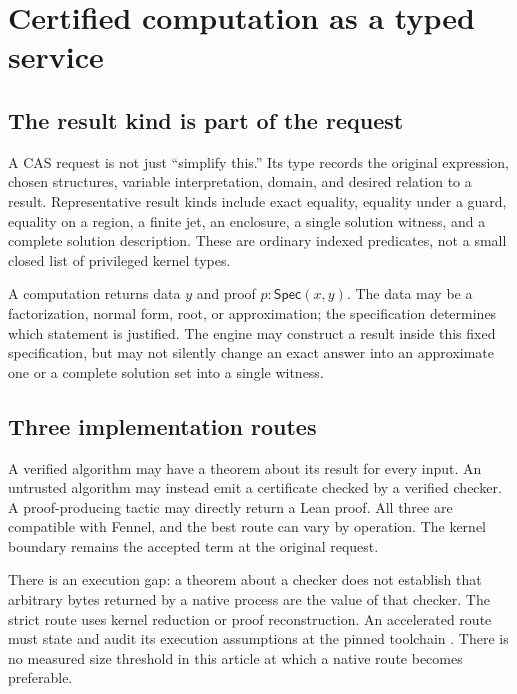 \documentclass[11pt,a4paper]{article}
\theoremstyle{definition}
\theoremstyle{remark}
\newcommand{\Spec}{\mathsf{Spec}}
\begin{document}
\section{Certified computation as a typed service}
\label{sec:cas}

\subsection{The result kind is part of the request}
A CAS request is not just ``simplify this.'' Its type records the original
expression, chosen structures, variable interpretation, domain, and desired
relation to a result. Representative result kinds include exact equality,
equality under a guard, equality on a region, a finite jet, an enclosure, a
single solution witness, and a complete solution description. These are
ordinary indexed predicates, not a small closed list of privileged kernel types.

A computation returns data $y$ and proof $p:\Spec(x,y)$. The data may be a
factorization, normal form, root, or approximation; the specification determines
which statement is justified. The engine may construct a result inside this
fixed specification, but may not silently change an exact answer into an
approximate one or a complete solution set into a single witness.

\subsection{Three implementation routes}
A verified algorithm may have a theorem about its result for every input. An
untrusted algorithm may instead emit a certificate checked by a verified
checker. A proof-producing tactic may directly return a Lean proof. All three
are compatible with Fennel, and the best route can vary by operation. The
kernel boundary remains the accepted term at the original request.

There is an execution gap: a theorem about a checker does not establish that
arbitrary bytes returned by a native process are the value of that checker.
The strict route uses kernel reduction or proof reconstruction. An accelerated
route must state and audit its execution assumptions at the pinned toolchain
\cite{leanAxioms}.
There is no measured size threshold in this article at which a native route
becomes preferable.
\end{document}

